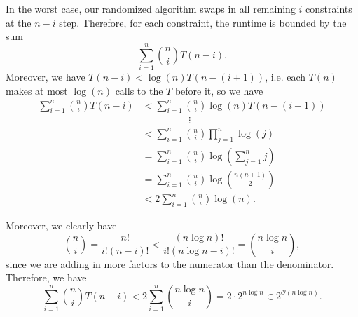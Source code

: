 \documentclass{article}
\newcommand{\problempart}[1]{\noindent{\textbf{(#1)}}}
\begin{document}
\problempart{b} In the worst case, our randomized algorithm swaps in all remaining $i$ constraints at the $n-i$ step. Therefore, for each constraint, the runtime is bounded by the sum
\[\sum_{i=1}^n \binom{n}{i} T(n-i).\]
Moreover, we have $T(n-i)<\log(n)T(n-(i+1))$, i.e. each $T(n)$ makes at most $\log(n)$ calls to the $T$ before it, so we have
\begin{align*}\sum_{i=1}^n \binom{n}{i} T(n-i)&<\sum_{i=1}^n \binom{n}{i}\log(n) T(n-(i+1))\\
&\hspace{2cm}\vdots\\
&<\sum_{i=1}^n \binom{n}{i} \prod_{j=1}^n \log(j)\\
&=\sum_{i=1}^n \binom{n}{i} \log\left(\sum_{j=1}^{n} j\right)\\
&=\sum_{i=1}^n \binom{n}{i} \log\left(\frac{n(n+1)}{2}\right)\\
&<2\sum_{i=1}^n \binom{n}{i} \log(n).\end{align*}

Moreover, we clearly have
\[\binom{n}{i}=\frac{n!}{i!(n-i)!}<\frac{(n\log n)!}{i!(n\log n - i)!} = \binom{n\log n}{i},\]
since we are adding in more factors to the numerator than the denominator. Therefore, we have
\[\sum_{i=1}^n \binom{n}{i} T(n-i) < 2\sum_{i=1}^n \binom{n\log n}{i} = 2\cdot 2^{n\log n} \in 2^{\mathcal{O}(n\log n)}.\]
\end{document}
